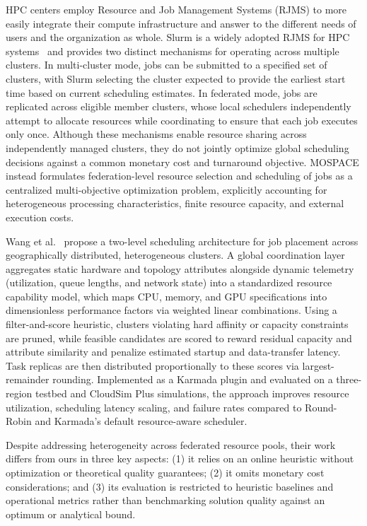 \documentclass[conference]{IEEEtran}
\begin{document}
HPC centers employ Resource and Job Management Systems (RJMS) to more easily integrate their compute infrastructure and answer to the different needs of users and the organization as whole. Slurm is a widely adopted RJMS for HPC systems~\cite{Yoo2003} and provides two distinct mechanisms for operating across multiple clusters. In multi-cluster mode, jobs can be submitted to a specified set of clusters, with Slurm selecting the cluster expected to provide the earliest start time based on current scheduling estimates. In federated mode\cite{Jette2023}, jobs are replicated across eligible member clusters, whose local schedulers independently attempt to allocate resources while coordinating to ensure that each job executes only once. Although these mechanisms enable resource sharing across independently managed clusters, they do not jointly optimize global scheduling decisions against a common monetary cost and turnaround objective. MOSPACE instead formulates federation-level resource selection and scheduling of jobs as a centralized multi-objective optimization problem, explicitly accounting for heterogeneous processing characteristics, finite resource capacity, and external execution costs.

Wang et al.~\cite{Wang2025Efficient} propose a two-level scheduling architecture for job placement across geographically distributed, heterogeneous clusters. A global coordination layer aggregates static hardware and topology attributes alongside dynamic telemetry (utilization, queue lengths, and network state) into a standardized resource capability model, which maps CPU, memory, and GPU specifications into dimensionless performance factors via weighted linear combinations. Using a filter-and-score heuristic, clusters violating hard affinity or capacity constraints are pruned, while feasible candidates are scored to reward residual capacity and attribute similarity and penalize estimated startup and data-transfer latency. Task replicas are then distributed proportionally to these scores via largest-remainder rounding. Implemented as a Karmada plugin and evaluated on a three-region testbed and CloudSim Plus simulations, the approach improves resource utilization, scheduling latency scaling, and failure rates compared to Round-Robin and Karmada's default resource-aware scheduler.

Despite addressing heterogeneity across federated resource pools, their work differs from ours in three key aspects: (1) it relies on an online heuristic without optimization or theoretical quality guarantees; (2) it omits monetary cost considerations; and (3) its evaluation is restricted to heuristic baselines and operational metrics rather than benchmarking solution quality against an optimum or analytical bound.
\end{document}
